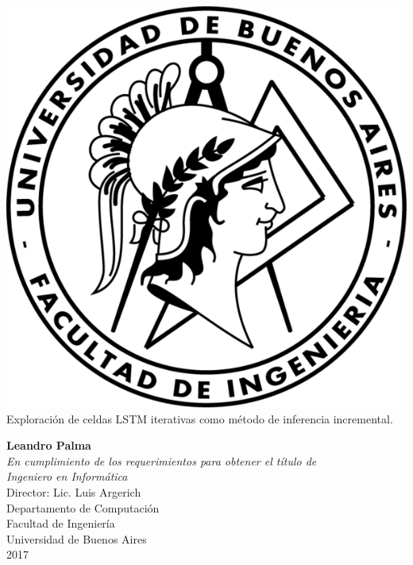 \documentclass{article}
\begin{document}
	\begin{titlepage}
		
		\vspace*{\fill}
		\begin{center}
			
			\includegraphics[scale=1]{fiuba.png}\\
			\quad\linebreak
			\quad\linebreak
			\huge Exploración de celdas LSTM iterativas como método de inferencia incremental.
			\quad\linebreak
			
			\quad\linebreak
			\large \textbf{Leandro Palma}\\
			\quad\linebreak	
			\quad\linebreak
			\textit{En cumplimiento de los requerimientos para obtener el título de\\
				Ingeniero en Informática}\\
			\quad\linebreak
			\quad\linebreak
			Director: Lic. Luis Argerich\\
			
			\quad\linebreak
			\quad\linebreak
			Departamento de Computación\\
			
			Facultad de Ingeniería\\
			
			Universidad de Buenos Aires\\
			
			2017
		\end{center}
		
		\vspace*{\fill}
	\end{titlepage}
	
\end{document}
